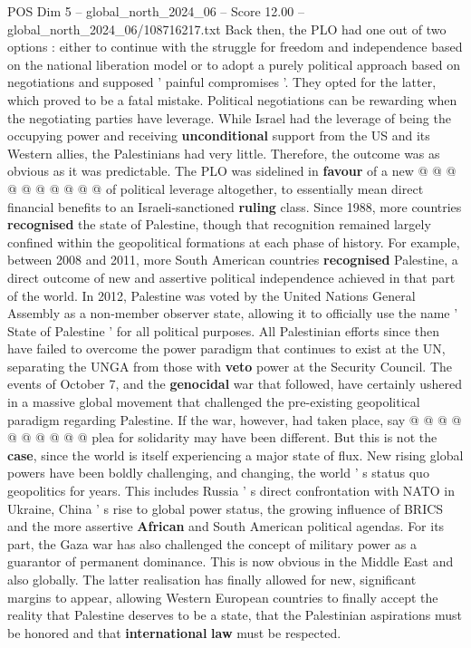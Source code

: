 \begin{textsample}{POS Dim 5 – global\_north\_2024\_06 – Score 12.00 – global\_north\_2024\_06/108716217.txt}
Back then, the PLO had one out of two options : either to continue with the struggle for freedom and independence based on the national liberation model or to adopt a purely political approach based on negotiations and supposed ' painful compromises '.
They opted for the latter, which proved to be a fatal mistake.
Political negotiations can be rewarding when the negotiating parties have leverage.
While Israel had the leverage of being the occupying power and receiving \textbf{unconditional} support from the US and its Western allies, the Palestinians had very little.
Therefore, the outcome was as obvious as it was predictable.
The PLO was sidelined in \textbf{favour} of a new @ @ @ @ @ @ @ @ @ @ of political leverage altogether, to essentially mean direct financial benefits to an Israeli-sanctioned \textbf{ruling} class.
Since 1988, more countries \textbf{recognised} the state of Palestine, though that recognition remained largely confined within the geopolitical formations at each phase of history.
For example, between 2008 and 2011, more South American countries \textbf{recognised} Palestine, a direct outcome of new and assertive political independence achieved in that part of the world.
In 2012, Palestine was voted by the United Nations General Assembly as a non-member observer state, allowing it to officially use the name ' State of Palestine ' for all political purposes.
All Palestinian efforts since then have failed to overcome the power paradigm that continues to exist at the UN, separating the UNGA from those with \textbf{veto} power at the Security Council.
The events of October 7, and the \textbf{genocidal} war that followed, have certainly ushered in a massive global movement that challenged the pre-existing geopolitical paradigm regarding Palestine.
If the war, however, had taken place, say @ @ @ @ @ @ @ @ @ @ plea for solidarity may have been different.
But this is not the \textbf{case}, since the world is itself experiencing a major state of flux.
New rising global powers have been boldly challenging, and changing, the world ' s status quo geopolitics for years.
This includes Russia ' s direct confrontation with NATO in Ukraine, China ' s rise to global power status, the growing influence of BRICS and the more assertive \textbf{African} and South American political agendas.
For its part, the Gaza war has also challenged the concept of military power as a guarantor of permanent dominance.
This is now obvious in the Middle East and also globally.
The latter realisation has finally allowed for new, significant margins to appear, allowing Western European countries to finally accept the reality that Palestine deserves to be a state, that the Palestinian aspirations must be honored and that \textbf{international} \textbf{law} must be respected.

\end{textsample}
